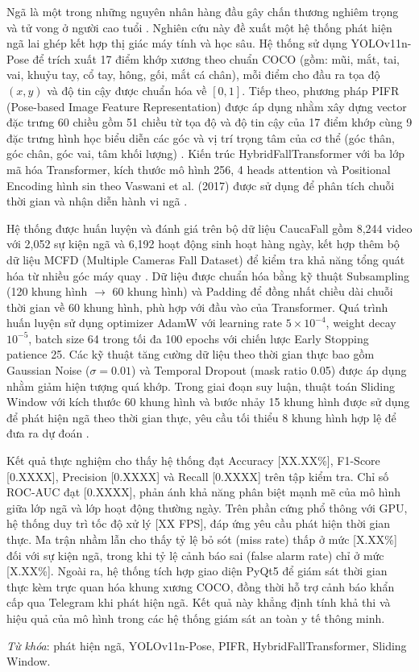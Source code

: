 \noindent Ngã là một trong những nguyên nhân hàng đầu gây chấn thương nghiêm trọng và tử vong ở người cao tuổi
 \cite{who2021falls}. Nghiên cứu này đề xuất một hệ thống phát hiện ngã lai ghép kết hợp thị giác máy tính và học sâu. 
 Hệ thống sử dụng YOLOv11n-Pose để trích xuất 17 điểm khớp xương theo chuẩn COCO (gồm: mũi, mắt, tai, vai, khuỷu tay,
  cổ tay, hông, gối, mắt cá chân), mỗi điểm cho đầu ra tọa độ $(x, y)$ và độ tin cậy được chuẩn hóa về $[0, 1]$.
   Tiếp theo, phương pháp PIFR (Pose-based Image Feature Representation) được áp dụng nhằm xây dựng vector đặc trưng
    60 chiều gồm 51 chiều từ tọa độ và độ tin cậy của 17 điểm khớp cùng 9 đặc trưng hình học biểu diễn các góc và 
    vị trí trọng tâm của cơ thể (góc thân, góc chân, góc vai, tâm khối lượng) \cite{kong2025pifr}. 
    Kiến trúc HybridFallTransformer với ba lớp mã hóa Transformer, kích thước mô hình 256, 4 heads 
    attention và Positional Encoding hình sin theo Vaswani et al. (2017) được sử dụng để phân tích
     chuỗi thời gian và nhận diễn hành vi ngã \cite{benabdennour2026real}.

Hệ thống được huấn luyện và đánh giá trên bộ dữ liệu CaucaFall gồm 8,244 video với 2,052 sự kiện ngã
 và 6,192 hoạt động sinh hoạt hàng ngày, kết hợp thêm bộ dữ liệu MCFD (Multiple Cameras Fall Dataset) để 
 kiểm tra khả năng tổng quát hóa từ nhiều góc máy quay \cite{kurniadi2026real}. Dữ liệu được chuẩn hóa bằng
  kỹ thuật Subsampling (120 khung hình $\rightarrow$ 60 khung hình) và Padding để đồng nhất chiều dài chuỗi 
  thời gian về 60 khung hình, phù hợp với đầu vào của Transformer. Quá trình huấn luyện sử dụng optimizer AdamW
   với learning rate $5 \times 10^{-4}$, weight decay $10^{-5}$, batch size 64 trong tối đa 100 epochs với chiến 
   lược Early Stopping patience 25. Các kỹ thuật tăng cường dữ liệu theo thời gian thực bao gồm Gaussian
    Noise ($\sigma = 0.01$) và Temporal Dropout (mask ratio 0.05) được áp dụng nhằm giảm hiện tượng quá khớp. 
    Trong giai đoạn suy luận, thuật toán Sliding Window với kích thước 60 khung hình và bước nhảy 15 khung hình
     được sử dụng để phát hiện ngã theo thời gian thực, yêu cầu tối thiểu 8 khung hình hợp lệ để đưa ra dự đoán
      \cite{liang2024skeleton}.

Kết quả thực nghiệm cho thấy hệ thống đạt Accuracy [XX.XX\%], F1-Score [0.XXXX], Precision [0.XXXX] và Recall [0.XXXX] trên tập kiểm tra. Chỉ số ROC-AUC đạt [0.XXXX], phản ánh khả năng phân biệt mạnh mẽ của mô hình giữa lớp ngã và lớp hoạt động thường ngày. Trên phần cứng phổ thông với GPU, hệ thống duy trì tốc độ xử lý [XX FPS], đáp ứng yêu cầu phát hiện thời gian thực. Ma trận nhầm lẫn cho thấy tỷ lệ bỏ sót (miss rate) thấp ở mức [X.XX\%] đối với sự kiện ngã, trong khi tỷ lệ cảnh báo sai (false alarm rate) chỉ ở mức [X.XX\%]. Ngoài ra, hệ thống tích hợp giao diện PyQt5 để giám sát thời gian thực kèm trực quan hóa khung xương COCO, đồng thời hỗ trợ cảnh báo khẩn cấp qua Telegram khi phát hiện ngã. Kết quả này khẳng định tính khả thi và hiệu quả của mô hình trong các hệ thống giám sát an toàn y tế thông minh.

\vspace{0.5cm}
\textit{Từ khóa}: phát hiện ngã, YOLOv11n-Pose, PIFR, HybridFallTransformer, Sliding Window.
